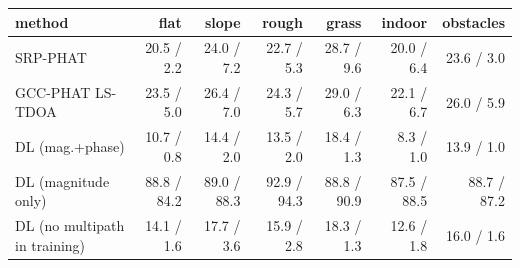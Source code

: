 \begin{tabular}{lrrrrrr}
\toprule
method & flat & slope & rough & grass & indoor & obstacles\\
\midrule
SRP-PHAT & 20.5 / 2.2 & 24.0 / 7.2 & 22.7 / 5.3 & 28.7 / 9.6 & 20.0 / 6.4 & 23.6 / 3.0 \\
GCC-PHAT LS-TDOA & 23.5 / 5.0 & 26.4 / 7.0 & 24.3 / 5.7 & 29.0 / 6.3 & 22.1 / 6.7 & 26.0 / 5.9 \\
DL (mag.+phase) & 10.7 / 0.8 & 14.4 / 2.0 & 13.5 / 2.0 & 18.4 / 1.3 & 8.3 / 1.0 & 13.9 / 1.0 \\
DL (magnitude only) & 88.8 / 84.2 & 89.0 / 88.3 & 92.9 / 94.3 & 88.8 / 90.9 & 87.5 / 88.5 & 88.7 / 87.2 \\
DL (no multipath in training) & 14.1 / 1.6 & 17.7 / 3.6 & 15.9 / 2.8 & 18.3 / 1.3 & 12.6 / 1.8 & 16.0 / 1.6 \\
\bottomrule
\end{tabular}
